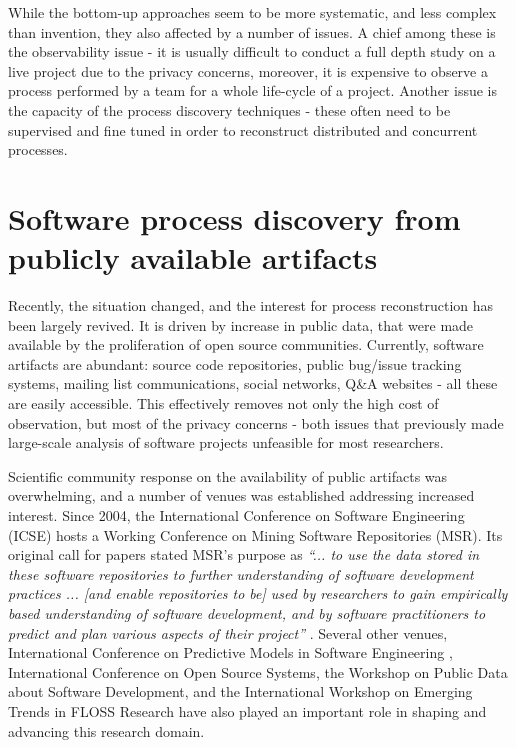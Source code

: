 While the bottom-up approaches seem to be more systematic, and less complex than invention, they 
also affected by a number of issues. A chief among these is the observability issue - 
it is usually difficult to conduct a full depth study on a live project due to the privacy concerns, 
moreover, it is expensive to observe a process performed by a team for a whole life-cycle of a project. 
Another issue is the capacity of the process discovery techniques - these often need to be supervised 
and fine tuned in order to reconstruct distributed and concurrent processes. 

\section{Software process discovery from publicly available artifacts}
Recently, the situation changed, and the interest for process reconstruction has been largely revived. 
It is driven by increase in public data, that were made available by the proliferation of open source communities.
Currently, software artifacts are abundant: source code repositories, public bug/issue tracking systems, 
mailing list communications, social networks, Q\&A websites - all these are easily accessible. 
This effectively removes not only the high cost of observation, but most of the privacy concerns - both 
issues that previously made large-scale analysis of software projects unfeasible for most researchers.

Scientific community response on the availability of public artifacts was overwhelming, and a number of 
venues was established addressing increased interest. 
Since 2004, the International Conference on Software Engineering (ICSE) hosts a Working Conference on 
Mining Software Repositories (MSR). Its original call for papers stated MSR's purpose as 
\textit{``... to use the data stored in these software repositories to further understanding of software 
development practices ... [and enable repositories to be] used by researchers to gain empirically based 
understanding of software development, and by software practitioners to predict and plan various aspects 
of their project''} \cite{msr2004} \cite{citeulike:7853299}. 
Several other venues, International Conference on Predictive Models in Software Engineering \cite{promise12}, 
International Conference on Open Source Systems, the Workshop on Public Data about Software Development, 
and the International Workshop on Emerging Trends in FLOSS Research have also played
an important role in shaping and advancing this research domain.

